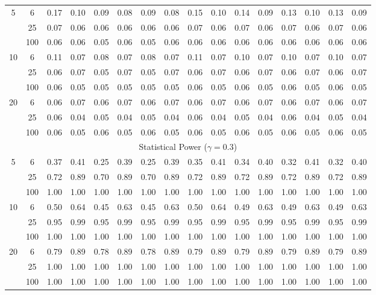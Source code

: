 \documentclass[
  man]{apa6}
\newenvironment{lltable}{\begin{landscape}\centering\begin{ThreePartTable}}{\end{ThreePartTable}\end{landscape}}
\begin{document}
\begin{lltable}
{\begin{longtable}{cccccccccccccccc}
5 & 6 & 0.17 & 0.10 & 0.09 & 0.08 & 0.09 & 0.08 & 0.15 & 0.10 & 0.14 & 0.09 & 0.13 & 0.10 & 0.13 & 0.09\\
 & 25 & 0.07 & 0.06 & 0.06 & 0.06 & 0.06 & 0.06 & 0.07 & 0.06 & 0.07 & 0.06 & 0.07 & 0.06 & 0.07 & 0.06\\
 & 100 & 0.06 & 0.06 & 0.05 & 0.06 & 0.05 & 0.06 & 0.06 & 0.06 & 0.06 & 0.06 & 0.06 & 0.06 & 0.06 & 0.06\\
10 & 6 & 0.11 & 0.07 & 0.08 & 0.07 & 0.08 & 0.07 & 0.11 & 0.07 & 0.10 & 0.07 & 0.10 & 0.07 & 0.10 & 0.07\\
 & 25 & 0.06 & 0.07 & 0.05 & 0.07 & 0.05 & 0.07 & 0.06 & 0.07 & 0.06 & 0.07 & 0.06 & 0.07 & 0.06 & 0.07\\
 & 100 & 0.06 & 0.05 & 0.05 & 0.05 & 0.05 & 0.05 & 0.06 & 0.05 & 0.06 & 0.05 & 0.06 & 0.05 & 0.06 & 0.05\\
20 & 6 & 0.06 & 0.07 & 0.06 & 0.07 & 0.06 & 0.07 & 0.06 & 0.07 & 0.06 & 0.07 & 0.06 & 0.07 & 0.06 & 0.07\\
 & 25 & 0.06 & 0.04 & 0.05 & 0.04 & 0.05 & 0.04 & 0.06 & 0.04 & 0.05 & 0.04 & 0.06 & 0.04 & 0.05 & 0.04\\
 & 100 & 0.06 & 0.05 & 0.06 & 0.05 & 0.06 & 0.05 & 0.06 & 0.05 & 0.06 & 0.05 & 0.06 & 0.05 & 0.06 & 0.05\\
\multicolumn{16}{c}{Statistical Power ($\gamma = 0.3$)}\\
5 & 6 & 0.37 & 0.41 & 0.25 & 0.39 & 0.25 & 0.39 & 0.35 & 0.41 & 0.34 & 0.40 & 0.32 & 0.41 & 0.32 & 0.40\\
 & 25 & 0.72 & 0.89 & 0.70 & 0.89 & 0.70 & 0.89 & 0.72 & 0.89 & 0.72 & 0.89 & 0.72 & 0.89 & 0.72 & 0.89\\
 & 100 & 1.00 & 1.00 & 1.00 & 1.00 & 1.00 & 1.00 & 1.00 & 1.00 & 1.00 & 1.00 & 1.00 & 1.00 & 1.00 & 1.00\\
10 & 6 & 0.50 & 0.64 & 0.45 & 0.63 & 0.45 & 0.63 & 0.50 & 0.64 & 0.49 & 0.63 & 0.49 & 0.63 & 0.49 & 0.63\\
 & 25 & 0.95 & 0.99 & 0.95 & 0.99 & 0.95 & 0.99 & 0.95 & 0.99 & 0.95 & 0.99 & 0.95 & 0.99 & 0.95 & 0.99\\
 & 100 & 1.00 & 1.00 & 1.00 & 1.00 & 1.00 & 1.00 & 1.00 & 1.00 & 1.00 & 1.00 & 1.00 & 1.00 & 1.00 & 1.00\\
20 & 6 & 0.79 & 0.89 & 0.78 & 0.89 & 0.78 & 0.89 & 0.79 & 0.89 & 0.79 & 0.89 & 0.79 & 0.89 & 0.79 & 0.89\\
 & 25 & 1.00 & 1.00 & 1.00 & 1.00 & 1.00 & 1.00 & 1.00 & 1.00 & 1.00 & 1.00 & 1.00 & 1.00 & 1.00 & 1.00\\
 & 100 & 1.00 & 1.00 & 1.00 & 1.00 & 1.00 & 1.00 & 1.00 & 1.00 & 1.00 & 1.00 & 1.00 & 1.00 & 1.00 & 1.00\\

\end{longtable}}
\end{lltable}
\end{document}
